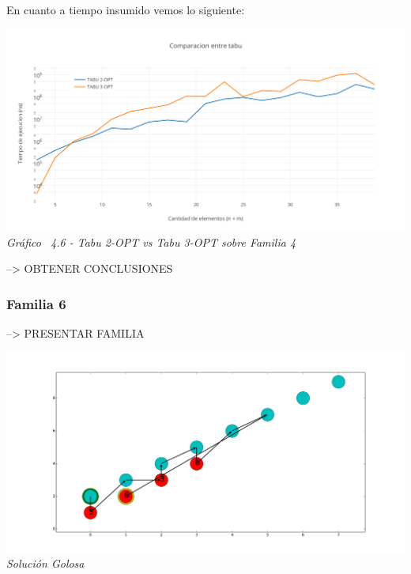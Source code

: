 En cuanto a tiempo insumido vemos lo siguiente:

\vspace*{0.3cm} \vspace*{0.3cm}
  \begin{center}
 \includegraphics[scale=0.5]{./EJ4/comparaciongym01.png}\\
 {            \textit{Gráfico \ 4.6 - Tabu 2-OPT vs Tabu 3-OPT sobre Familia 4}}
  \end{center}
  \vspace*{0.3cm}

--> OBTENER CONCLUSIONES

\subsubsection*{Familia 6}

--> PRESENTAR FAMILIA

\vspace*{0.3cm} \vspace*{0.3cm}
  \begin{center}
 \includegraphics[scale=0.3]{./EJ4/fam6goloso.png}\\
 {            \textit{Soluci\'on Golosa}}
  \end{center}
  \vspace*{0.3cm}

